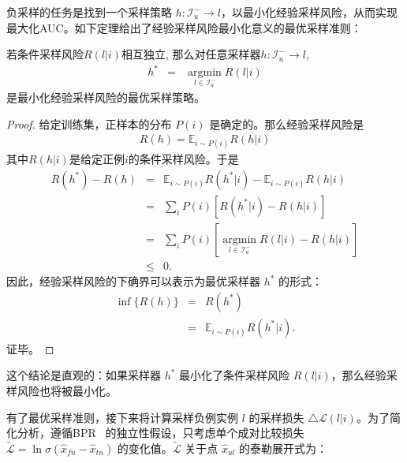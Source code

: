 负采样的任务是找到一个采样策略 $h:\mathcal{I}_u^- \rightarrow l$，以最小化经验采样风险，从而实现最大化AUC。如下定理给出了经验采样风险最小化意义的最优采样准则：
\begin{theorem}[最优采样准则] \label{optimalrule}
若条件采样风险$R(l|i)$相互独立, 那么对任意采样器$h: \mathcal{I}_u^- \rightarrow l$,
	\begin{eqnarray}\label{Eq:OptimalSam}
		h^* &=&   \mathop{\arg\min}\limits_{l \in\mathcal{I}_u^-} R(l|i)
	\end{eqnarray}
是最小化经验采样风险的最优采样策略。
	\begin{proof}
给定训练集，正样本的分布 $P(i)$ 是确定的。那么经验采样风险是
		\begin{eqnarray}
			R(h) = \mathbb{E}_{i \sim P(i) } R(h|i)
		\end{eqnarray}
其中$R(h|i)$是给定正例$i$的条件采样风险。于是
		\begin{eqnarray}
	R(h^*) - R(h)
			&=&	\mathbb{E}_{i \sim P(i) }  R(h^*|i) - \mathbb{E}_{i \sim P(i) }  R(h|i)  \nonumber \\
			&=& \sum_i P(i)  [R(h^*|i) - R(h|i)] \nonumber \\
			&=& \sum_i P(i)  [  \mathop{\arg\min}\limits_{l \in\mathcal{I}_u^-} R(l|i)  - R(h|i)]\nonumber \\
			&\leq& 0.
		\end{eqnarray}
因此，经验采样风险的下确界可以表示为最优采样器 $h^*$ 的形式：
		\begin{eqnarray}
			\inf \{R(h)\} 	&=& R(h^*) \nonumber\\
			&=& \mathbb{E}_{i \sim P(i) } R(h^*|i).
		\end{eqnarray}
证毕。
	\end{proof}

\end{theorem}
这个结论是直观的：如果采样器 $h^*$ 最小化了条件采样风险 $R(l|i)$，那么经验采样风险也将被最小化。

有了最优采样准则，接下来将计算采样负例实例 $l$ 的采样损失 $\triangle \mathcal{L}(l|i)$。为了简化分析，遵循BPR~\cite{Steffen:2009:UAI} 的独立性假设，只考虑单个成对比较损失$\tilde{\mathcal{L}}= \ln \sigma(\hat{x}_{fn} - \hat{x}_{tn})$ 的变化值。$\tilde{\mathcal{L}}$ 关于点 $\hat{x}_{ul}$ 的泰勒展开式为：





